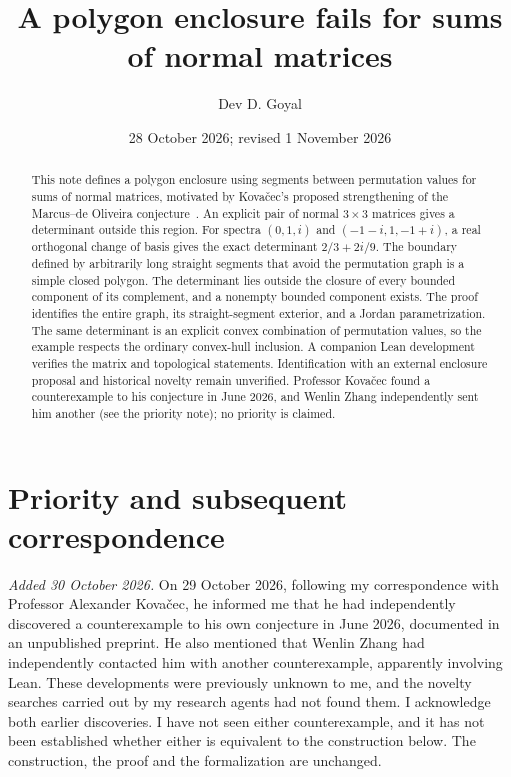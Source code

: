 \documentclass[11pt]{article}
\title{A polygon enclosure fails for sums of normal matrices}
\author{Dev D. Goyal}
\date{28 October 2026; revised 1 November 2026}
\begin{document}
\maketitle
\begin{abstract}
This note defines a polygon enclosure using segments between permutation values for sums of normal matrices, motivated by Kova\v{c}ec's proposed strengthening of the Marcus--de Oliveira conjecture~\cite{kovacec2026}. An explicit pair of normal $3\times3$ matrices gives a determinant outside this region. For spectra $(0,1,i)$ and $(-1-i,1,-1+i)$, a real orthogonal change of basis gives the exact determinant $2/3+2i/9$. The boundary defined by arbitrarily long straight segments that avoid the permutation graph is a simple closed polygon. The determinant lies outside the closure of every bounded component of its complement, and a nonempty bounded component exists. The proof identifies the entire graph, its straight-segment exterior, and a Jordan parametrization. The same determinant is an explicit convex combination of permutation values, so the example respects the ordinary convex-hull inclusion. A companion Lean development verifies the matrix and topological statements. Identification with an external enclosure proposal and historical novelty remain unverified. Professor Kova\v{c}ec found a counterexample to his conjecture in June 2026, and Wenlin Zhang independently sent him another (see the priority note); no priority is claimed.
\end{abstract}

\section*{Priority and subsequent correspondence}
\emph{Added 30 October 2026.} On 29 October 2026, following my correspondence with Professor Alexander Kova\v{c}ec, he informed me that he had independently discovered a counterexample to his own conjecture in June 2026, documented in an unpublished preprint. He also mentioned that Wenlin Zhang had independently contacted him with another counterexample, apparently involving Lean. These developments were previously unknown to me, and the novelty searches carried out by my research agents had not found them. I acknowledge both earlier discoveries. I have not seen either counterexample, and it has not been established whether either is equivalent to the construction below. The construction, the proof and the formalization are unchanged.
\end{document}
